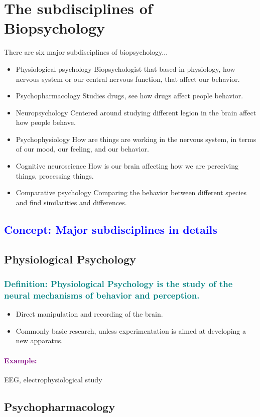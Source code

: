 \documentclass[12pt,a4paper]{article}
\newcommand{\concept}[1]{\subsection*{\textcolor{blue}{Concept: #1}}}
\newcommand{\definition}[1]{\subsubsection*{\textcolor{teal}{Definition: #1}}}
\newcommand{\example}[1]{\paragraph{\textcolor{purple}{Example:}} #1}
\begin{document}
	\section{The subdisciplines of Biopsychology}
	
	There are six major subdisciplines of biopsychology...
	\begin{itemize}
		\item Physiological psychology
		\subitem Biopsychologist that based in physiology, how nervous system or our central nervous function, that affect our behavior. 
		\item Psychopharmacology
		\subitem Studies drugs, see how drugs affect people behavior. 
		\item Neuropsychology
		\subitem Centered around studying different legion in the brain affect how people behave. 
		\item Psychophysiology
		\subitem How are things are working in the nervous system, in terms of our mood, our feeling, and our behavior. 
		\item Cognitive neuroscience
		\subitem How is our brain affecting how we are perceiving things, processing things. 
		\item Comparative psychology
		\subitem Comparing the behavior between different species and find similarities and differences. 
	\end{itemize}
	
	\concept{Major subdisciplines in details}
	
	\subsection{Physiological Psychology}
	
	\definition{\textbf{Physiological Psychology} is the study of the neural mechanisms of behavior and perception.}
	
	\begin{itemize}
		\item Direct manipulation and recording of the brain. 
		\item Commonly basic research, unless experimentation is aimed at developing a new apparatus. 
	\end{itemize}
	
	\example{EEG, electrophysiological study}
	
	\subsection{Psychopharmacology}
	
\end{document}
